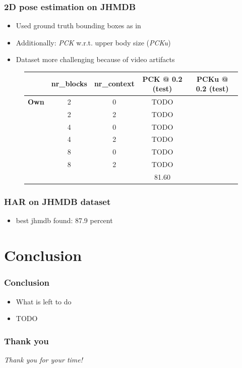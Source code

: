 \documentclass[9pt]{beamer}
\newenvironment{myframe}[1][]{%
\begin{frame}%
\frametitle{#1}
\setcounter{footnote}{0}


}{%
\end{frame}%
}
\begin{document}
\begin{myframe}[2D pose estimation on JHMDB]
    \begin{itemize}
        \item Used ground truth bounding boxes as in \footnotemark
        \item Additionally: \textit{PCK} w.r.t. upper body size (\textit{PCKu})
        \item Dataset more challenging because of video artifacts
    \end{itemize}
    \begin{figure}
        \begin{table}[]
            \small
            \begin{tabular}{|l|c|c|c|c|}
            \hline
             & \textbf{nr\_blocks} & \textbf{nr\_context} & \textbf{PCK @ 0.2 (test)} & \textbf{PCKu @ 0.2 (test)} \\ \hline
            \textbf{Own} & 2 & 0 & TODO &  \\
            \textbf{} & 2 & 2 & TODO &  \\
            \textbf{} & 4 & 0 & TODO &  \\
            \textbf{} & 4 & 2 & TODO &  \\
            \textbf{} & 8 & 0 & TODO &  \\
            \textbf{} & 8 & 2 & TODO &  \\ \hline
            \textbf{\footnotemark} &  &  & 81.60 &  \\ \hline
            \end{tabular}
        \end{table}
    \end{figure}
\end{myframe}

\begin{myframe}[HAR on JHMDB dataset]
    \begin{itemize}
        \item best jhmdb found: 87.9 percent \footnotemark
    \end{itemize}
\end{myframe}

\section{Conclusion}
\begin{myframe}[Conclusion]
    \begin{itemize}
         \item What is left to do
        \item TODO
    \end{itemize}
\end{myframe}

\begin{myframe}[Thank you]
    \centering \Large
    \emph{Thank you for your time!}
\end{myframe}
\end{document}
